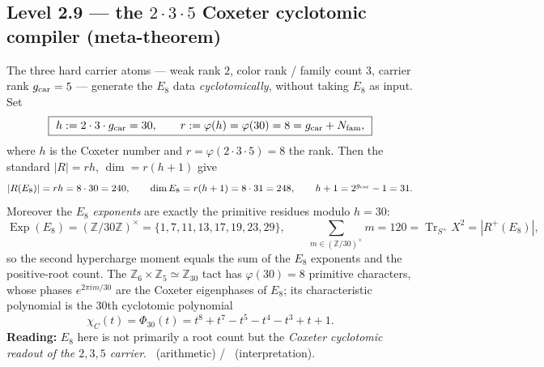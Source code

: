 \subsection{Level 2.9 --- the $2{\cdot}3{\cdot}5$ Coxeter cyclotomic compiler (meta-theorem)}
The three hard carrier atoms --- weak rank $2$, color rank / family count $3$, carrier rank
$g_{\mathrm{car}}=5$ --- generate the $E_8$ data \emph{cyclotomically}, without taking $E_8$ as input. Set
\begin{equation}
  \boxed{\ h:=2\cdot3\cdot\gcar=30,\qquad r:=\varphi(h)=\varphi(30)=8=\gcar+\Nfam,\ }
\end{equation}
where $h$ is the Coxeter number and $r=\varphi(2{\cdot}3{\cdot}5)=8$ the rank. Then the standard
$|R|=rh$, $\dim=r(h{+}1)$ give
\begin{equation}
  |R(E_8)|=rh=8\cdot30=240,\qquad \dim E_8=r(h+1)=8\cdot31=248,\qquad h+1=2^{g_{\mathrm{car}}}-1=31 .
\end{equation}
Moreover the $E_8$ \emph{exponents} are exactly the primitive residues modulo $h=30$:
\begin{equation}
  \operatorname{Exp}(E_8)=(\mathbb Z/30\mathbb Z)^\times=\{1,7,11,13,17,19,23,29\},\qquad
  \sum_{m\in(\mathbb Z/30)^\times}\!\! m=120=\operatorname{Tr}_{S^+}X^2=|R^+(E_8)|,
\end{equation}
so the second hypercharge moment equals the sum of the $E_8$ exponents and the positive-root count.
The $\mathbb Z_6\times\mathbb Z_5\simeq\mathbb Z_{30}$ tact has $\varphi(30)=8$ primitive characters,
whose phases $e^{2\pi i m/30}$ are the Coxeter eigenphases of $E_8$; its characteristic polynomial is
the $30$th cyclotomic polynomial
\begin{equation}
  \chi_C(t)=\Phi_{30}(t)=t^8+t^7-t^5-t^4-t^3+t+1 .
\end{equation}
\textbf{Reading:} $E_8$ here is not primarily a root count but the \emph{Coxeter cyclotomic readout of
the $2,3,5$ carrier}. \mE\ (arithmetic) / \mC\ (interpretation).

